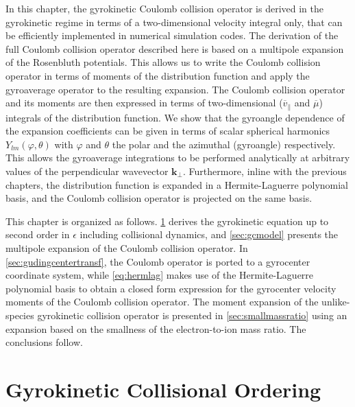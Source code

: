 %
In this chapter, the gyrokinetic Coulomb collision operator is derived in the gyrokinetic regime in terms of a two-dimensional velocity integral only, that can be efficiently implemented in numerical simulation codes.
%
The derivation of the full Coulomb collision operator described here is based on a multipole expansion of the Rosenbluth potentials.
%
This allows us to write the Coulomb collision operator in terms of moments of the distribution function and apply the gyroaverage operator to the resulting expansion.
%
The Coulomb collision operator and its moments are then expressed in terms of two-dimensional ($\overline v_\parallel$ and $\overline \mu$) integrals of the  distribution function.
%
We show that the gyroangle dependence of the expansion coefficients can be given in terms of scalar spherical harmonics $Y_{lm}(\varphi,\theta)$ with $\varphi$ and $\theta$ the polar and the azimuthal (gyroangle) respectively.
%
This allows the gyroaverage integrations to be performed analytically at arbitrary values of the perpendicular wavevector $\mathbf k_\perp$.
%
Furthermore, inline with the previous chapters, the distribution function is expanded in a Hermite-Laguerre polynomial basis, and the Coulomb collision operator is projected on the same basis.

This chapter is organized as follows. 
%
\cref{sec:ordering1} derives the gyrokinetic equation up to second order in $\epsilon$ including collisional dynamics, and \cref{sec:gcmodel} presents the multipole expansion of the Coulomb collision operator.
%
In \cref{sec:gudingcentertransf}, the Coulomb operator is ported to a gyrocenter coordinate system, while \cref{eq:hermlag} makes use of the Hermite-Laguerre polynomial basis to obtain a closed form expression for the gyrocenter velocity moments of the Coulomb collision operator.
%
The moment expansion of the unlike-species gyrokinetic collision operator is presented in \cref{sec:smallmassratio} using an expansion based on the smallness of the electron-to-ion mass ratio.
%
The conclusions follow.

\section{Gyrokinetic Collisional Ordering}
\label{sec:ordering1}

